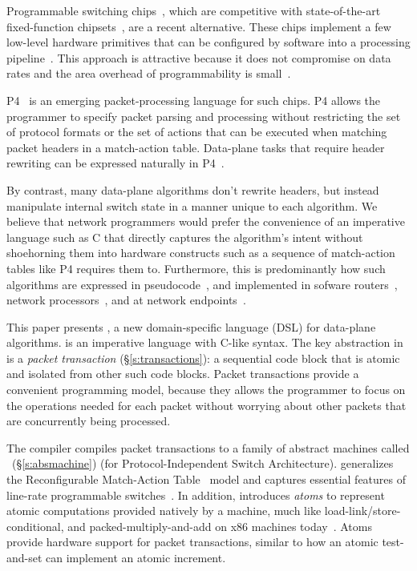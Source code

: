 Programmable switching chips~\cite{flexpipe, xpliant, rmt}, which are
competitive with state-of-the-art fixed-function chipsets~\cite{trident,
tomahawk, mellanox}, are a recent alternative.  These chips implement a few
low-level hardware primitives that can be configured by software into a
processing pipeline~\cite{xpliant_sdk,xpliant_sdk2,intel_sdk}. This approach is
attractive because it does not compromise on data rates and the area overhead
of programmability is small~\cite{rmt}.

P4~\cite{p4, p4spec} is an emerging packet-processing language for
such chips. P4 allows the programmer to specify packet parsing and
processing without restricting the set of protocol formats or the set
of actions that can be executed when matching packet headers in a
match-action table. Data-plane tasks that require header rewriting can
be expressed naturally in P4~\cite{dc_p4}.

By contrast, many data-plane algorithms don't rewrite headers, but instead
manipulate internal switch state in a manner unique to each algorithm. We
believe that network programmers would prefer the convenience of an imperative
language such as C that directly captures the algorithm's intent without
shoehorning them into hardware constructs such as a sequence of match-action
tables like P4 requires them to.  Furthermore, this is predominantly how such
algorithms are expressed in pseudocode~\cite{red, csfq, codel_code, avq, blue},
and implemented in sofware routers~\cite{click, dpdk, routebricks}, network
processors~\cite{packetc, nova}, and at network endpoints~\cite{qdisc}.

This paper presents \pktlanguage, a new domain-specific language (DSL) for
data-plane algorithms.  \pktlanguage is an imperative language with C-like
syntax. The key abstraction in \pktlanguage is a {\em packet transaction}
(\S\ref{s:transactions}): a sequential code block that is atomic and isolated
from other such code blocks. Packet transactions provide a convenient
programming model, because they allows the programmer to focus on the
operations needed for each packet without worrying about other packets that are
concurrently being processed.

The \pktlanguage compiler compiles packet transactions to a family of
abstract machines called \absmachine~(\S\ref{s:absmachine}) (for
Protocol-Independent Switch Architecture). \absmachine generalizes the
Reconfigurable Match-Action Table~\cite{rmt} model and captures essential
features of line-rate programmable switches~\cite{rmt, xpliant, flexpipe}. In
addition, \absmachine introduces {\em atoms} to represent atomic computations
provided natively by a \absmachine machine, much like
load-link/store-conditional, and packed-multiply-and-add on x86 machines
today~\cite{x86_manual}.  Atoms provide hardware support for packet
transactions, similar to how an atomic test-and-set can implement an atomic
increment.

